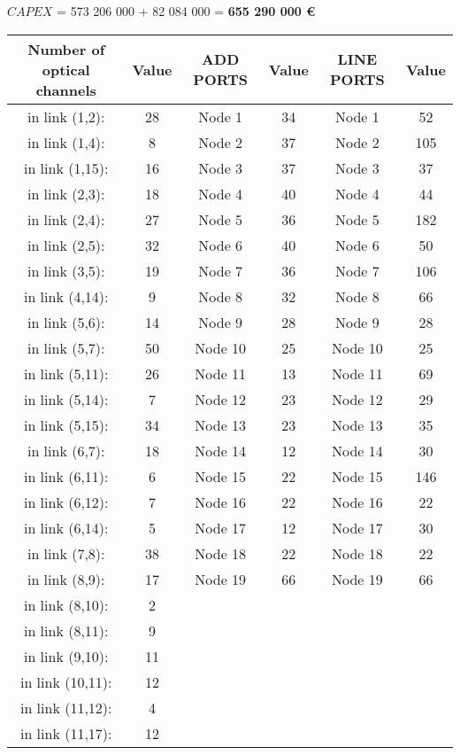 $CAPEX$ = 573 206 000 + 82 084 000 = \textbf{655 290 000 \euro}\\

\begin{table}[h!]
\centering
\begin{tabular}{|| c | c || c | c || c | c ||}
 \hline
 Number of optical channels & Value & ADD PORTS & Value & LINE PORTS & Value \\
 \hline\hline
in link (1,2): & 28& Node 1 & 34 & Node 1 & 52 \\
in link (1,4): & 8& Node 2 & 37 & Node 2 & 105 \\
in link (1,15): & 16& Node 3 & 37 & Node 3 & 37 \\
in link (2,3): & 18& Node 4 & 40 & Node 4 & 44 \\
in link (2,4): & 27& Node 5 & 36 & Node 5 & 182 \\
in link (2,5): & 32& Node 6 & 40 & Node 6 & 50 \\
in link (3,5): & 19& Node 7 & 36 & Node 7 & 106 \\
in link (4,14): & 9& Node 8 & 32 & Node 8 & 66 \\
in link (5,6): & 14& Node 9 & 28 & Node 9 & 28 \\
in link (5,7): & 50& Node 10 & 25 & Node 10 & 25 \\
in link (5,11): & 26& Node 11 & 13 & Node 11 & 69 \\
in link (5,14): & 7& Node 12 & 23 & Node 12 & 29 \\
in link (5,15): & 34& Node 13 & 23 & Node 13 & 35 \\
in link (6,7): & 18& Node 14 & 12 & Node 14 & 30 \\
in link (6,11): & 6& Node 15 & 22 & Node 15 & 146 \\
in link (6,12): & 7 &Node 16 & 22 & Node 16 & 22 \\
in link (6,14): & 5& Node 17 & 12 & Node 17 & 30 \\
in link (7,8): & 38& Node 18 & 22 & Node 18 & 22 \\
in link (8,9): & 17& Node 19 & 66 & Node 19 & 66 \\
in link (8,10): & 2& & & & \\
in link (8,11): & 9& & & & \\
in link (9,10): & 11& & & & \\
in link (10,11): & 12& & & & \\
in link (11,12): & 4& & & & \\
in link (11,17): & 12& & & & \\

\end{tabular}
\end{table}
